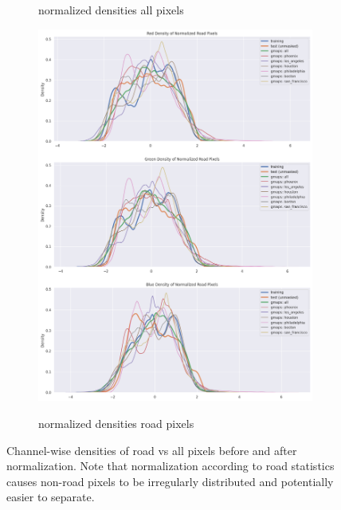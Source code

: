 \documentclass[10pt,conference,compsocconf]{IEEEtran}
\begin{document}
\begin{figure}[ht]
\begin{subfigure}{0.495\textwidth}
        \label{fig:distr_pixels_norm}
        \caption{normalized densities all pixels}
    \end{subfigure}
    \begin{subfigure}{0.495\textwidth}
        \includegraphics[width=.9\textwidth]{pictures/distr_pixels_road_norm.png}
        \label{fig:distr_pixels_road_norm}
        \caption{normalized densities road pixels}
    \end{subfigure}
    \captionsetup{width=0.9\textwidth}
    \caption{Channel-wise densities of road vs all pixels before and after normalization. Note that normalization according to road statistics causes non-road pixels to be irregularly distributed and potentially easier to separate.}
    \label{fig:distr}
\end{figure}
\end{document}
